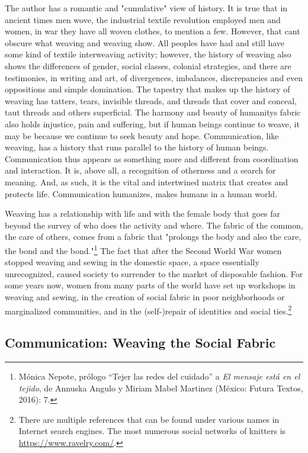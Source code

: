 \documentclass{tufte-handout}
\begin{document}
The author has a romantic and "cumulative" view of history. It is true
that in ancient times men wove, the industrial textile revolution
employed men and women, in war they have all woven clothes, to mention a
few. However, that can\textquotesingle t obscure what weaving and
weaving show. All peoples have had and still have some kind of textile
interweaving activity; however, the history of weaving also shows the
differences of gender, social classes, colonial strategies, and there
are testimonies, in writing and art, of divergences, imbalances,
discrepancies and even oppositions and simple domination. The tapestry
that makes up the history of weaving has tatters, tears, invisible
threads, and threads that cover and conceal, taut threads and others
superficial. The harmony and beauty of humanity\textquotesingle s fabric
also holds injustice, pain and suffering, but if human beings continue
to weave, it may be because we continue to seek beauty and hope.
Communication, like weaving, has a history that runs parallel to the
history of human beings. Communication thus appears as something more
and different from coordination and interaction. It is, above all, a
recognition of otherness and a search for meaning. And, as such, it is
the vital and intertwined matrix that creates and protects life.
Communication humanizes, makes humans in a human world.

Weaving has a relationship with life and with the female body that goes
far beyond the survey of who does the activity and where. The fabric of
the common, the care of others, comes from a fabric that "prolongs the
body and also the care, the bond and the bond."\footnote{Mónica Nepote,
  prólogo ``Tejer las redes del cuidado'' a \emph{El mensaje está en el
  tejido}, de Annuska Angulo y Miriam Mabel Martinez (México: Futura
  Textos, 2016): 7.} The fact that after the Second World War women
stopped weaving and sewing in the domestic space, a space essentially
unrecognized, caused society to surrender to the market of disposable
fashion. For some years now, women from many parts of the world have set
up workshops in weaving and sewing, in the creation of social fabric in
poor neighborhoods or marginalized communities, and in the (self-)repair
of identities and social ties.\footnote{There are multiple references
  that can be found under various names in Internet search engines. The
  most numerous social networks of knitters is
  \url{https://www.ravelry.com/}.}

\hypertarget{communication-weaving-the-social-fabric}{%
\subsection{Communication: Weaving the Social
Fabric}\label{communication-weaving-the-social-fabric}}
\end{document}
